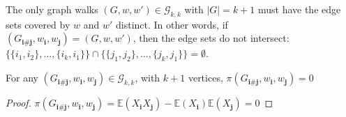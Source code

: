 \begin{lemma}
  \label{lem:disjoint_edge_set}
  \notready
  The only graph walks $(G,w,w')\in \mathcal{G}_{k,k}$ with $|G|=k+1$ must have the edge sets covered by $w$ and $w'$ distinct.
  In other words, if $(G_{\mathbf{i}\#\mathbf{j}},w_\mathbf{i},w_\mathbf{j}) = (G,w,w')$, then the edge sets do not intersect:
  $\{\{i_1,i_2\},\ldots,\{i_k,i_1\}\}\cap\{\{j_1,j_2\},\ldots,\{j_k,j_1\}\}=\emptyset$.
\end{lemma}


\begin{lemma}
  \label{lem:G_leq_k}
  \notready
  For any $(G_{\mathbf{i}\#\mathbf{j}},w_\mathbf{i},w_\mathbf{j}) \in \mathcal{G}_{k,k}$, with $k + 1$ vertices, $\pi(G_{\mathbf{i}\#\mathbf{j}},w_\mathbf{i},w_\mathbf{j})  = 0$
\end{lemma}

\begin{proof}
  $\pi(G_{\mathbf{i}\#\mathbf{j}},w_\mathbf{i},w_\mathbf{j}) = \mathbb{E}(X_{\mathbf{i}}X_{\mathbf{j}}) - \mathbb{E}(X_{\mathbf{i}})\mathbb{E}(X_{\mathbf{j}})  = 0$
\end{proof}
